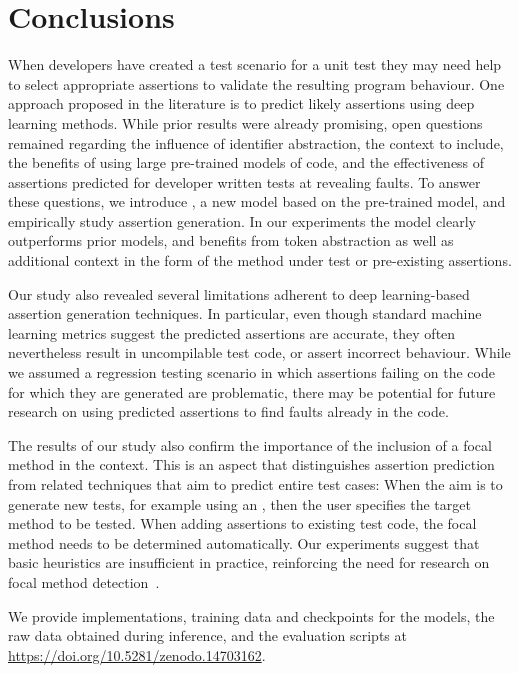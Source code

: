 
\section{Conclusions}

When developers have created a test scenario for a unit test they may
need help to select appropriate assertions to validate the resulting
program behaviour. One approach proposed in the literature is to
predict likely assertions using deep learning methods. While prior
results were already promising, open questions remained regarding the
influence of identifier abstraction, the context to include, the
benefits of using large pre-trained models of code, and the
effectiveness of assertions predicted for developer written tests at
revealing faults. To answer these questions, we introduce \assertfive,
a new model based on the pre-trained \codetfive model, and empirically
study assertion generation. In our experiments the \assertfive model
clearly outperforms prior models, and benefits from token abstraction
as well as additional context in the form of the method under test or
pre-existing assertions.

Our study also revealed several limitations adherent to deep
learning-based assertion generation techniques. In particular, even
though standard machine learning metrics suggest the predicted
assertions are accurate, they often nevertheless result in
uncompilable test code, or assert incorrect behaviour. While we
assumed a regression testing scenario in which assertions failing on
the code for which they are generated are problematic, there may be
potential for future research on using predicted assertions to find
faults already in the code.

The results of our study also confirm the importance of the inclusion
of a focal method in the context. This is an aspect that distinguishes
assertion prediction from related techniques that aim to predict
entire test cases: When the aim is to generate new tests, for example
using an \llm, then the user specifies the target method to be tested.
When adding assertions to existing test code, the focal method needs
to be determined automatically. Our experiments suggest that basic
heuristics are insufficient in practice, reinforcing the need for
research on focal method detection~\cite{Parizi2014,White2022,He2024}.




We provide implementations, training data and checkpoints for the
models, the raw data obtained during inference, and the evaluation
scripts at \url{https://doi.org/10.5281/zenodo.14703162}.

